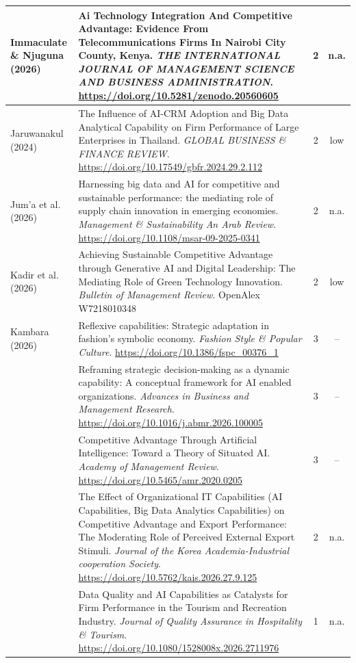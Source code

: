 {\begin{longtable}{|>{\raggedright\arraybackslash}p{2.6cm}|>{\raggedright\arraybackslash}p{10.2cm}|c|c|}
Immaculate \& Njuguna (2026) & Ai Technology Integration And Competitive Advantage: Evidence From Telecommunications Firms In Nairobi City County, Kenya. \textit{THE INTERNATIONAL JOURNAL OF MANAGEMENT SCIENCE AND BUSINESS ADMINISTRATION}. \url{https://doi.org/10.5281/zenodo.20560605} & 2 & n.a. \\ \hline
Jaruwanakul (2024) & The Influence of AI-CRM Adoption and Big Data Analytical Capability on Firm Performance of Large Enterprises in Thailand. \textit{GLOBAL BUSINESS \& FINANCE REVIEW}. \url{https://doi.org/10.17549/gbfr.2024.29.2.112} & 2 & low \\ \hline
Jum’a et al. (2026) & Harnessing big data and AI for competitive and sustainable performance: the mediating role of supply chain innovation in emerging economies. \textit{Management \& Sustainability An Arab Review}. \url{https://doi.org/10.1108/msar-09-2025-0341} & 2 & n.a. \\ \hline
Kadir et al. (2026) & Achieving Sustainable Competitive Advantage through Generative AI and Digital Leadership: The Mediating Role of Green Technology Innovation. \textit{Bulletin of Management Review}. OpenAlex W7218010348 & 2 & low \\ \hline
Kambara (2026) & Reflexive capabilities: Strategic adaptation in fashion’s symbolic economy. \textit{Fashion Style \& Popular Culture}. \url{https://doi.org/10.1386/fspc_00376_1} & 3 & -- \\ \hline
\textcite{karami2026} & Reframing strategic decision-making as a dynamic capability: A conceptual framework for AI enabled organizations. \textit{Advances in Business and Management Research}. \url{https://doi.org/10.1016/j.abmr.2026.100005} & 3 & -- \\ \hline
\textcite{kemp2024} & Competitive Advantage Through Artificial Intelligence: Toward a Theory of Situated AI. \textit{Academy of Management Review}. \url{https://doi.org/10.5465/amr.2020.0205} & 3 & -- \\ \hline
\textcite{kim2026} & The Effect of Organizational IT Capabilities (AI Capabilities, Big Data Analytics Capabilities) on Competitive Advantage and Export Performance: The Moderating Role of Perceived External Export Stimuli. \textit{Journal of the Korea Academia-Industrial cooperation Society}. \url{https://doi.org/10.5762/kais.2026.27.9.125} & 2 & n.a. \\ \hline
\textcite{kokash2026} & Data Quality and AI Capabilities as Catalysts for Firm Performance in the Tourism and Recreation Industry. \textit{Journal of Quality Assurance in Hospitality \& Tourism}. \url{https://doi.org/10.1080/1528008x.2026.2711976} & 1 & n.a. \\ \hline

\end{longtable}}
